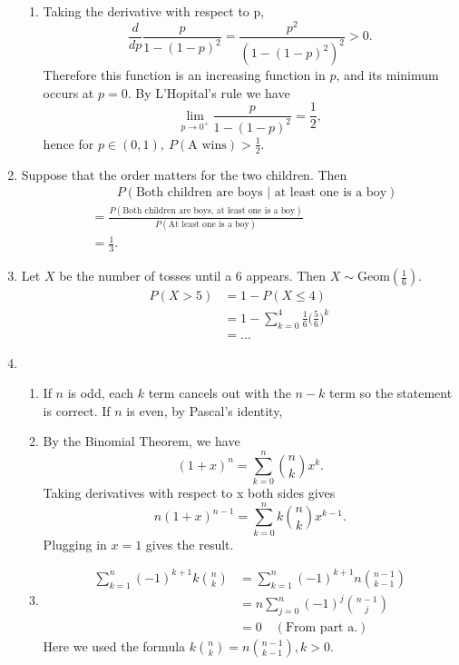 \documentclass{article}
\begin{document}
\begin{enumerate}
\begin{enumerate}
        \item Taking the derivative with respect to p, 
        \[ \frac{d}{dp} \frac{p}{1 - (1-p)^2} = \frac{p^2}{(1 - (1 - p)^2)^2} > 0. \]
        Therefore this function is an increasing function in $p$, and its minimum occurs at 
        $p = 0$. By L'Hopital's rule we have 
        \[ \lim_{p \to 0^+} \frac{p}{1 - (1 - p)^2} = \frac{1}{2}, \]
        hence for $p \in (0, 1), \ P(\text{A wins}) > \frac{1}{2}$.
    \end{enumerate}

    \item Suppose that the order matters for the two children. Then 
    \begin{align*}
        &\qquad P(\text{Both children are boys | at least one is a boy}) \\
        &= \frac{P(\text{Both children are boys, at least one is a boy})}
        {P(\text{At least one is a boy})} \\
        &= \frac{1}{3}.
    \end{align*}

    \item Let $X$ be the number of tosses until a 6 appears. Then 
    $X \sim \text{Geom}(\frac{1}{6})$.
    \begin{align*}
        P(X > 5) 
        &= 1 - P(X \leq 4) \\
        &= 1 - \sum_{k = 0}^{4} \frac{1}{6} \Big( \frac{5}{6} \Big)^{k} \\
        &= ...
    \end{align*}

    \item \begin{enumerate}
        \item If $n$ is odd, each $k$ term cancels out with the $n - k$ term so the statement 
        is correct. If $n$ is even, by Pascal's identity, 

        \item By the Binomial Theorem, we have 
        \[ (1 + x)^{n} = \sum_{k = 0}^{n} \binom{n}{k}x^{k}. \]
        Taking derivatives with respect to x both sides gives 
        \[ n(1 + x)^{n - 1} = \sum_{k = 0}^{n} k \binom{n}{k}x^{k-1}.\]
        Plugging in $x = 1$ gives the result.

        \item \begin{align*}
            \sum_{k = 1}^{n} (-1)^{k + 1} k\binom{n}{k}
            &= \sum_{k = 1}^{n} (-1)^{k + 1} n\binom{n - 1}{k - 1} \\
            &= n\sum_{j = 0}^{n} (-1)^{j} \binom{n - 1}{j} \\
            &= 0 \quad (\text{From part a.})
        \end{align*}
        Here we used the formula $k\binom{n}{k} = n\binom{n - 1}{k - 1}, k > 0$.
    \end{enumerate}


\end{enumerate}
\end{document}
